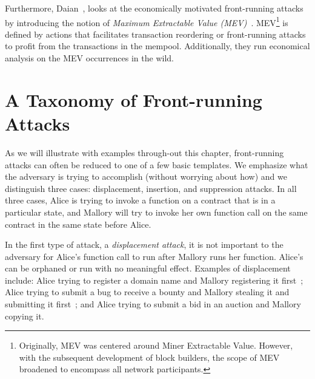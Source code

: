 Furthermore, Daian~\etal, looks at the economically motivated front-running attacks by introducing the notion of \textit{Maximum Extractable Value (MEV)}~\cite{daian2019flash}. MEV\footnote{Originally, MEV was centered around Miner Extractable Value. However, with the subsequent development of block builders, the scope of MEV broadened to encompass all network participants.} is defined by actions that facilitates transaction reordering or front-running attacks to profit from the transactions in the mempool. Additionally, they run economical analysis on the MEV occurrences in the wild. 












\section{A Taxonomy of Front-running Attacks}
\label{sec:taxonomy}

As we will illustrate with examples through-out this chapter, front-running attacks can often be reduced to one of a few basic templates. We emphasize what the adversary is trying to accomplish (without worrying about how) and we distinguish three cases: displacement, insertion, and suppression attacks. In all three cases, Alice is trying to invoke a function on a contract that is in a particular state, and Mallory will try to invoke her own function call on the same contract in the same state before Alice.

In the first type of attack, a \textit{displacement attack}, it is not important to the adversary for Alice's function call to run after Mallory runs her function. Alice's can be orphaned or run with no meaningful effect. Examples of displacement include: Alice trying to register a domain name and Mallory registering it first~\cite{kalodner2015empirical}; Alice trying to submit a bug to receive a bounty and Mallory stealing it and submitting it first~\cite{breidenbach2018enter}; and Alice trying to submit a bid in an auction and Mallory copying it. 

